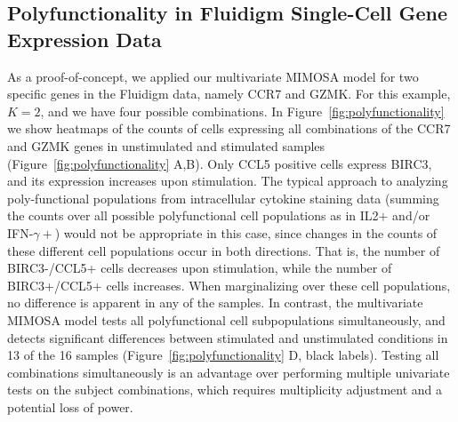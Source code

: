 \documentclass[12pt,oupdraft]{biostatistics}
\begin{document}
\subsection{Polyfunctionality in Fluidigm Single-Cell Gene Expression Data}
As a proof-of-concept, we applied our multivariate MIMOSA model for two specific genes in the Fluidigm data, namely CCR7 and GZMK. For this example, $K=2$, and we have four possible combinations.
In Figure~\ref{fig:polyfunctionality} we show heatmaps of the counts of cells expressing all combinations of the CCR7 and GZMK genes in unstimulated and stimulated samples (Figure~\ref{fig:polyfunctionality} A,B). Only CCL5 positive cells express BIRC3, and its expression increases upon stimulation. The typical approach to analyzing poly-functional populations from intracellular cytokine staining data (summing the counts over all possible polyfunctional cell populations  as in IL2$+$ and/or IFN-$\gamma+$) would not be appropriate in this case, since changes in the counts of these different cell populations occur in both directions. That is, the number of BIRC3-/CCL5+ cells decreases upon stimulation, while the number of BIRC3+/CCL5+ cells increases. When marginalizing over these cell populations, no difference is apparent in any of the samples. In contrast, the multivariate MIMOSA model tests all polyfunctional cell subpopulations simultaneously, and detects significant differences between stimulated and unstimulated conditions in 13 of the 16 samples (Figure~\ref{fig:polyfunctionality} D, black labels). Testing all combinations simultaneously is an advantage over performing multiple univariate tests on the subject combinations, which requires multiplicity adjustment and a potential loss of power.
\end{document}
